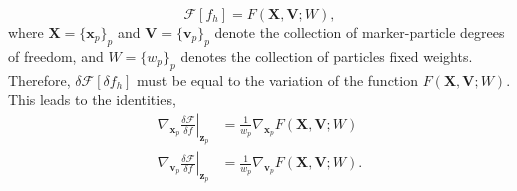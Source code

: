\documentclass[preprint,12pt]{elsarticle}
\theoremstyle{definition}
\begin{document}
\begin{equation}
\mathcal{F} \left[ f_h \right] = F (\boldsymbol{X}, \boldsymbol{V}; W),
\end{equation}
where $\boldsymbol{X} = \{ \boldsymbol{x}_p \}_p$ and $\boldsymbol{V} = \{ \boldsymbol{v}_p \}_p$ denote the collection of marker-particle degrees of freedom, and $W = \{ w_p \}_p$ denotes the collection of particles fixed weights. Therefore, $\delta \mathcal{F} \left[ \delta f_h \right]$ must be equal to the variation of the function $F \left(\boldsymbol{X}, \boldsymbol{V}; W\right)$. This leads to the identities,
\begin{align}
\left.\nabla_{\boldsymbol{x}_p} \frac{\delta \mathcal{F}}{\delta f}\right|_{\boldsymbol{z}_{p}} &=\frac{1}{w_{p}} \nabla_{\boldsymbol{x}_p} F(\boldsymbol{X}, \boldsymbol{V} ; W) \label{Identity1}\\
\left.\nabla_{\boldsymbol{v}_p} \frac{\delta \mathcal{F}}{\delta f}\right|_{\boldsymbol{z}_{p}} &=\frac{1}{w_{p}} \nabla_{\boldsymbol{v}_p} F(\boldsymbol{X}, \boldsymbol{V} ; W). \label{Identity2}
\end{align}
\end{document}
